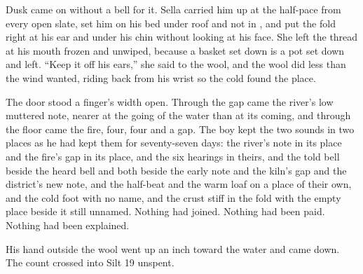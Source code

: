 Dusk came on without a bell for it. Sella carried him up at the half-pace from every open slate, set him on his bed under  roof and not in , and put the fold right at his ear and under his chin without looking at his face. She left the thread at his mouth frozen and unwiped, because a basket set down is a pot set down and left. “Keep it off his ears,” she said to the wool, and the wool did less than the wind wanted, riding back from his wrist so the cold found the place.

The door stood a finger's width open. Through the gap came the river's low muttered note, nearer at the going of the water than at its coming, and through the floor came the fire, four, four and a gap. The boy kept the two sounds in two places as he had kept them for seventy-seven days: the river's note in its place and the fire's gap in its place, and the six hearings in theirs, and the told bell beside the heard bell and both beside the early note and the kiln's gap and the district's new note, and the half-beat and the warm loaf on a place of their own, and the cold foot with no name, and the crust stiff in the fold with the empty place beside it still unnamed. Nothing had joined. Nothing had been paid. Nothing had been explained.

His hand outside the wool went up an inch toward the water and came down. The count crossed into Silt 19 unspent.
